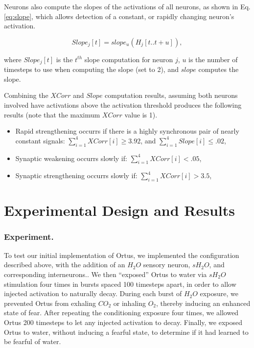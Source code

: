 \documentclass[letterpaper]{article}
\begin{document}
Neurons also compute the slopes of the activations of all neurons, as shown in Eq. \ref{eq:slope}, which allows detection of a constant, or rapidly changing neuron's activation.



\begin{equation}
    \label{eq:slope}
    Slope_j[t] =  slope_u(H_{j}[t..t+u]),
\end{equation}

where $Slope_j[t]$ is the $t^{th}$ slope computation for neuron $j$, $u$ is the number of timesteps to use when computing the slope (set to 2), and $slope$ computes the slope.

Combining the $XCorr$ and $Slope$ computation results, assuming both neurons involved have activations above the activation threshold produces the following results (note that the maximum $XCorr$ value is 1).

\begin{itemize}
    \itemsep0em
    \item Rapid strengthening occurrs if there is a highly synchronous pair of nearly constant signals:
        \subitem $\sum_{i=1}^{4}{ XCorr[i]} \ge 3.92$, and
        \subitem $\sum_{i=1}^{4}{ Slope[i]} \le .02$,
    \item Synaptic weakening occurrs slowly if:
        \subitem $\sum_{i=1}^{4}{ XCorr[i]} < .05$,
    \item Synaptic strengthening occurrs slowly if:
        \subitem $\sum_{i=1}^{4}{ XCorr[i]} > 3.5$,
\end{itemize}

\section{Experimental Design and Results}

\subsubsection{Experiment.} To test our initial implementation of Ortus, we implemented the configuration described above, with the addition of an $H_2O$ sensory neuron, $sH_2O$, and corresponding interneurons..
We then ``exposed'' Ortus to water via $sH_2O$ stimulation four times in bursts spaced 100 timesteps apart, in order to allow injected activation to naturally decay.
During each burst of $H_2O$ exposure, we prevented Ortus from exhaling $CO_2$ or inhaling $O_2$, thereby inducing an enhanced state of fear.
After repeating the conditioning exposure four times, we allowed Ortus 200 timesteps to let any injected activation to decay.
Finally, we exposed Ortus to water, without inducing a fearful state, to determine if it had learned to be fearful of water.
\end{document}
